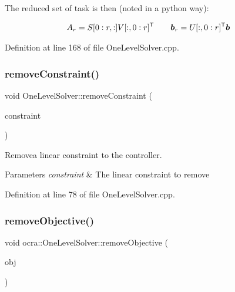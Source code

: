 The reduced set of task is then (noted in a python way)\+:

\begin{align*} A_r &= S[0:r, :] V[:, 0:r] ^{\mathsf{T}} & & & \mbox{\boldmath${b}$}_r &= U[:, 0:r] ^{\mathsf{T}} \mbox{\boldmath${b}$} \end{align*} 

Definition at line 168 of file One\+Level\+Solver.\+cpp.

\hypertarget{classocra_1_1OneLevelSolver_ae111869c3f0d4b405bfcb325a2fb7283}{}\label{classocra_1_1OneLevelSolver_ae111869c3f0d4b405bfcb325a2fb7283} 
\subsubsection{\texorpdfstring{remove\+Constraint()}{removeConstraint()}}
{\footnotesize\ttfamily void One\+Level\+Solver\+::remove\+Constraint (\begin{DoxyParamCaption}\item[{\hyperlink{namespaceocra_ae8b87cf4099be3efc3b410019ad2046e}{ocra\+::\+Linear\+Constraint} \&}]{constraint }\end{DoxyParamCaption})}

Removea linear constraint to the controller.


\begin{DoxyParams}{Parameters}
{\em constraint} & The linear constraint to remove \\
\hline
\end{DoxyParams}


Definition at line 78 of file One\+Level\+Solver.\+cpp.

\hypertarget{classocra_1_1OneLevelSolver_a667f69c3c70fd99622d2417f91466299}{}\label{classocra_1_1OneLevelSolver_a667f69c3c70fd99622d2417f91466299} 
\subsubsection{\texorpdfstring{remove\+Objective()}{removeObjective()}}
{\footnotesize\ttfamily void ocra\+::\+One\+Level\+Solver\+::remove\+Objective (\begin{DoxyParamCaption}\item[{\hyperlink{classocra_1_1OneLevelSolver_a93b0be052a859bbd4c81584aa1646ffb}{Objective\+Type} \&}]{obj }\end{DoxyParamCaption})\hspace{0.3cm}{\ttfamily [inline]}}



